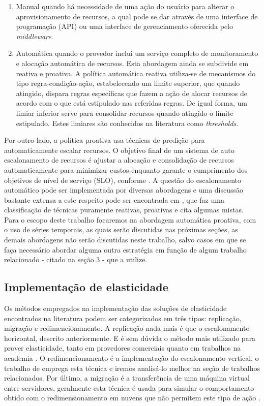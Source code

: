 \documentclass[twoside,english,brazilian]{UNISINOSmonografia}
\begin{document}
\begin{enumerate}
	\item Manual quando há necessidade de uma ação do usuário para alterar o aprovisionamento de recursos, a qual pode se dar através de uma interface de programação (API) ou uma interface de gerenciamento oferecida pelo \textit{middleware}.
	\item Automática quando o provedor inclui um serviço completo de monitoramento e alocação automática de recursos. Esta abordagem ainda se subdivide em reativa e proativa.
	A política automática reativa utiliza-se de mecanismos do tipo regra-condição-ação, estabelecendo um limite superior, que quando atingido, dispara regras específicas que fazem a ação de alocar recursos de acordo com o que está estipulado nas referidas regras. De igual forma, um limiar inferior serve para consolidar recursos quando atingido o limite estipulado. Estes limiares são conhecidos na literatura como \textit{thresholds}.
\end{enumerate}	
	Por outro lado, a política proativa usa técnicas de predição para automaticamente escalar recursos. O objetivo final de um sistema de auto escalonamento de recursos é ajustar a alocação e consolidação de recursos automaticamente para minimizar custos enquanto garante o cumprimento dos objetivos de nível de serviço (SLO), conforme \cite{Lorido-botr2012}.
	A questão do escalonamento automático pode ser implementada por diversas abordagens e uma discussão bastante extensa a este respeito pode ser encontrada em \cite{Lorido-botr2012}, que faz uma classificação de técnicas puramente reativas, proativas e cita algumas mistas. 	Para o escopo deste trabalho focaremos na abordagem automática proativa, com o uso de séries temporais, as quais serão discutidas nas próximas seções, as demais abordagens não serão discutidas neste trabalho, salvo casos em que se faça necessário abordar alguma outra estratégia em função de algum trabalho relacionado - citado na seção 3 - que a utilize.

\subsection{Implementação de elasticidade}
Os métodos empregados na implementação das soluções de elasticidade encontrados na literatura podem ser categorizados em três tipos: replicação, migração e redimencionamento. A replicação nada mais é que o escalonamento horizontal, descrito anteriormente. E é sem dúvida o método mais utilizado para prover elasticidade, tanto em provedores comerciais quanto em trabalhos na academia \cite{Galante2012}. O redimencionamento é a implementação do escalonamento vertical, o trabalho de \cite{Wilkes2010} emprega esta técnica e iremos analisá-lo melhor na seção de trabalhos relacionados. Por último, a migração é a transferência de uma máquina virtual entre servidores, geralmente esta técnica é usada para simular o comportamento obtido com o redimensionamento em nuvens que não permitem este tipo de ação \cite{Galante2012}.
\end{document}
